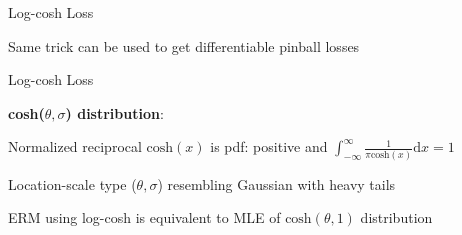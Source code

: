 \documentclass[11pt,compress,t,notes=noshow, xcolor=table]{beamer}
\begin{document}
\begin{frame}{Log-cosh Loss }

\vfill
{}
{}

\vfill

Same trick can be used to get differentiable pinball losses

\end{frame}

\begin{frame}{Log-cosh Loss }

\textbf{cosh($\theta,\sigma$) distribution}:\\

\begin{itemizeL}

\item Normalized reciprocal $\text{cosh}(x)$ is pdf: 
positive and $\int_{-\infty}^{\infty} \frac{1}{\pi \text{cosh}(x)} \text{d}x = 1$

\item Location-scale type ($\theta, \sigma$) 
resembling Gaussian with heavy tails

\item ERM using log-cosh 
is equivalent to MLE of $\text{cosh}(\theta,1)$ distribution

\end{itemizeL}

\vfill

{}


\end{frame}
\end{document}
